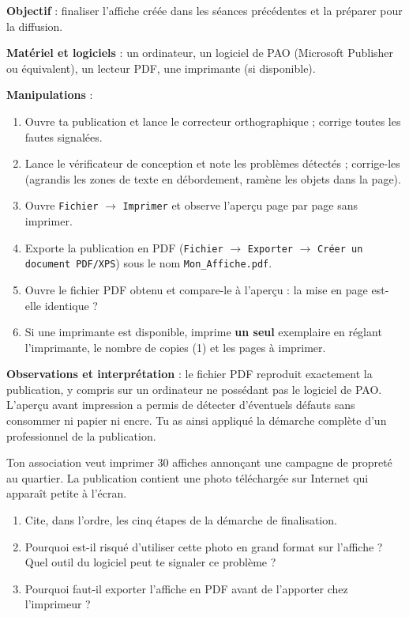 \documentclass[11pt]{article}
\begin{document}
\begin{experience}
\textbf{Objectif} : finaliser l'affiche créée dans les séances précédentes et la préparer pour la diffusion.\par
\textbf{Matériel et logiciels} : un ordinateur, un logiciel de PAO (Microsoft Publisher ou équivalent), un lecteur PDF, une imprimante (si disponible).\par
\textbf{Manipulations} :
\begin{enumerate}
\item Ouvre ta publication et lance le correcteur orthographique ; corrige toutes les fautes signalées.
\item Lance le vérificateur de conception et note les problèmes détectés ; corrige-les (agrandis les zones de texte en débordement, ramène les objets dans la page).
\item Ouvre \texttt{Fichier} $\rightarrow$ \texttt{Imprimer} et observe l'aperçu page par page sans imprimer.
\item Exporte la publication en PDF (\texttt{Fichier} $\rightarrow$ \texttt{Exporter} $\rightarrow$ \texttt{Créer un document PDF/XPS}) sous le nom \texttt{Mon\_Affiche.pdf}.
\item Ouvre le fichier PDF obtenu et compare-le à l'aperçu : la mise en page est-elle identique ?
\item Si une imprimante est disponible, imprime \textbf{un seul} exemplaire en réglant l'imprimante, le nombre de copies (1) et les pages à imprimer.
\end{enumerate}
\textbf{Observations et interprétation} : le fichier PDF reproduit exactement la publication, y compris sur un ordinateur ne possédant pas le logiciel de PAO. L'aperçu avant impression a permis de détecter d'éventuels défauts sans consommer ni papier ni encre. Tu as ainsi appliqué la démarche complète d'un professionnel de la publication.
\end{experience}

\begin{exercice}
Ton association veut imprimer 30 affiches annonçant une campagne de propreté au quartier. La publication contient une photo téléchargée sur Internet qui apparaît petite à l'écran.
\begin{enumerate}
\item Cite, dans l'ordre, les cinq étapes de la démarche de finalisation.
\item Pourquoi est-il risqué d'utiliser cette photo en grand format sur l'affiche ? Quel outil du logiciel peut te signaler ce problème ?
\item Pourquoi faut-il exporter l'affiche en PDF avant de l'apporter chez l'imprimeur ?
\end{enumerate}
\end{exercice}
\end{document}
